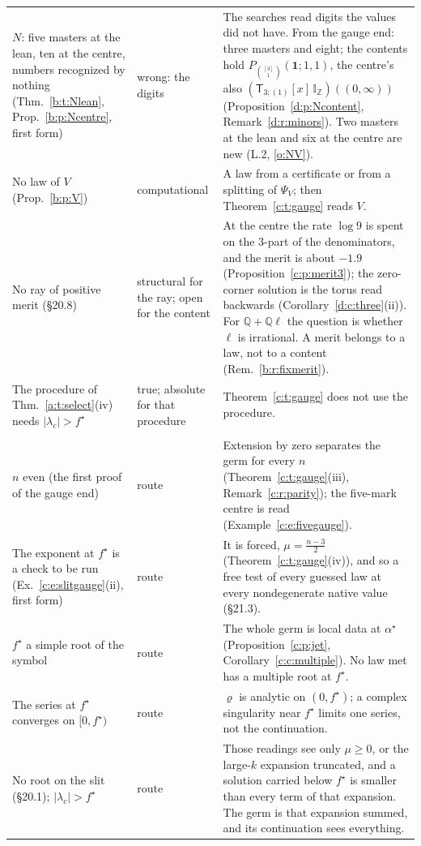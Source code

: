 \documentclass[11pt]{article}
\newcommand{\one}{\mathbf 1}
\newcommand{\sT}{\mathsf T}
\newcommand{\IZ}{\mathbb I_{\mathbb Z}}
\newcommand{\Tx}[3]{(\sT_{#1;(1)}[x]\,#2)((#3,\infty))}
\newcommand{\Pth}{P_{\binom{[3]}1}(\one;1,1)}
\newcommand{\Zt}{\Tx3{\IZ}0}
\theoremstyle{plain}
\theoremstyle{definition}
\theoremstyle{remark}
\begin{document}
{\begin{longtable}{@{}>{\raggedright}p{4.5cm} >{\raggedright}p{2.3cm} >{\raggedright\arraybackslash}p{8.2cm}@{}}
$N$: five masters at the lean, ten at the centre, numbers recognized by nothing (Thm.~\ref{b:t:Nlean}, Prop.~\ref{b:p:Ncentre}, first form) & wrong: the digits & The searches read digits the values did not have. From the gauge end: three masters and eight; the contents hold $\Pth$, the centre's also $\Zt$ (Proposition~\ref{d:p:Ncontent}, Remark~\ref{d:r:minors}). Two masters at the lean and six at the centre are new (L.2, \ref{o:NV}).\\
No law of $V$ (Prop.~\ref{b:p:V}) & computational & A law from a certificate or from a splitting of $\Psi_V$; then Theorem~\ref{c:t:gauge} reads $V$.\\
No ray of positive merit (\S20.8) & structural for the ray; open for the content & At the centre the rate $\log9$ is spent on the $3$-part of the denominators, and the merit is about $-1.9$ (Proposition~\ref{c:p:merit3}); the zero-corner solution is the torus read backwards (Corollary~\ref{d:c:three}(ii)). For $\mathbb Q+\mathbb Q\ell$ the question is whether $\ell$ is irrational. A merit belongs to a law, not to a content (Rem.~\ref{b:r:fixmerit}).\\
The procedure of Thm.~\ref{a:t:select}(iv) needs $|\lambda_c|>f^\star$ & true; absolute for that procedure & Theorem~\ref{c:t:gauge} does not use the procedure.\\[4pt]
\multicolumn{3}{@{}l}{\emph{The hypotheses of the readings}}\\[2pt]
$n$ even (the first proof of the gauge end) & route & Extension by zero separates the germ for every $n$ (Theorem~\ref{c:t:gauge}(iii), Remark~\ref{c:r:parity}); the five-mark centre is read (Example~\ref{c:e:fivegauge}).\\
The exponent at $f^\star$ is a check to be run (Ex.~\ref{c:e:slitgauge}(ii), first form) & route & It is forced, $\mu=\frac{n-3}2$ (Theorem~\ref{c:t:gauge}(iv)), and so a free test of every guessed law at every nondegenerate native value (\S21.3).\\
$f^\star$ a simple root of the symbol & route & The whole germ is local data at $\alpha^\star$ (Proposition~\ref{c:p:jet}, Corollary~\ref{c:c:multiple}). No law met has a multiple root at $f^\star$.\\
The series at $f^\star$ converges on $[0,f^\star)$ & route & $\varrho$ is analytic on $(0,f^\star)$; a complex singularity near $f^\star$ limits one series, not the continuation.\\
No root on the slit (\S20.1); $|\lambda_c|>f^\star$ & route & Those readings see only $\mu\ge0$, or the large-$k$ expansion truncated, and a solution carried below $f^\star$ is smaller than every term of that expansion. The germ is that expansion summed, and its continuation sees everything.\\

\end{longtable}}
\end{document}
